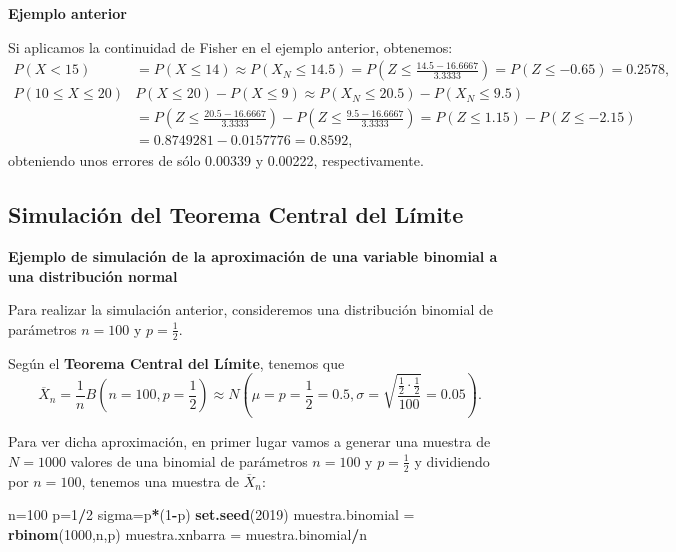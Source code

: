 \documentclass[]{book}
\newenvironment{Shaded}{\begin{snugshade}}{\end{snugshade}}
\newcommand{\DecValTok}[1]{\textcolor[rgb]{0.00,0.00,0.81}{#1}}
\newcommand{\KeywordTok}[1]{\textcolor[rgb]{0.13,0.29,0.53}{\textbf{#1}}}
\newcommand{\NormalTok}[1]{#1}
\newcommand{\OperatorTok}[1]{\textcolor[rgb]{0.81,0.36,0.00}{\textbf{#1}}}
\newcommand{\StringTok}[1]{\textcolor[rgb]{0.31,0.60,0.02}{#1}}
\begin{document}
\textbf{Ejemplo anterior}

Si aplicamos la continuidad de Fisher en el ejemplo anterior, obtenemos:
\[
\begin{array}{rl}
P(X< 15) & = P(X\leq 14) \approx P(X_N \leq 14.5)=P\left(Z\leq \frac{14.5-16.6667}{3.3333}\right) =P(Z\leq -0.65) = 0.2578,\\
P(10\leq X\leq 20) & P(X\leq 20)-P(X\leq 9)\approx P(X_N \leq 20.5)-P(X_N\leq 9.5) \\ & = P\left(Z\leq \frac{20.5-16.6667}{3.3333}\right) - P\left(Z\leq \frac{9.5-16.6667}{3.3333}\right)=  P(Z\leq 1.15)-P(Z\leq -2.15)\\ & =0.8749281-0.0157776 = 0.8592,
\end{array}
\]
obteniendo unos errores de sólo 0.00339 y 0.00222, respectivamente.

\hypertarget{simulaciuxf3n-del-teorema-central-del-luxedmite}{%
\subsection{Simulación del Teorema Central del Límite}\label{simulaciuxf3n-del-teorema-central-del-luxedmite}}

\textbf{Ejemplo de simulación de la aproximación de una variable binomial a una distribución normal}

Para realizar la simulación anterior, consideremos una distribución binomial de parámetros \(n=100\) y \(p=\frac{1}{2}\).

Según el \textbf{Teorema Central del Límite}, tenemos que
\[
\overline{X}_n=\frac{1}{n}B\left(n=100,p=\frac{1}{2}\right)\approx N\left(\mu = p=\frac{1}{2}=0.5,\sigma=\sqrt{\frac{\frac{1}{2}\cdot \frac{1}{2}}{100}}=0.05\right).
\]

Para ver dicha aproximación, en primer lugar vamos a generar una muestra de \(N=1000\) valores de una binomial de parámetros \(n=100\) y \(p=\frac{1}{2}\) y dividiendo por \(n=100\), tenemos una muestra de \(\overline{X}_n\):

\begin{Shaded}
\begin{Highlighting}[]
\NormalTok{n=}\DecValTok{100}
\NormalTok{p=}\DecValTok{1}\OperatorTok{/}\DecValTok{2}
\NormalTok{sigma=p}\OperatorTok{*}\NormalTok{(}\DecValTok{1}\OperatorTok{-}\NormalTok{p)}
\KeywordTok{set.seed}\NormalTok{(}\DecValTok{2019}\NormalTok{)}
\NormalTok{muestra.binomial =}\StringTok{ }\KeywordTok{rbinom}\NormalTok{(}\DecValTok{1000}\NormalTok{,n,p)}
\NormalTok{muestra.xnbarra =}\StringTok{ }\NormalTok{muestra.binomial}\OperatorTok{/}\NormalTok{n}
\end{Highlighting}
\end{Shaded}
\end{document}

